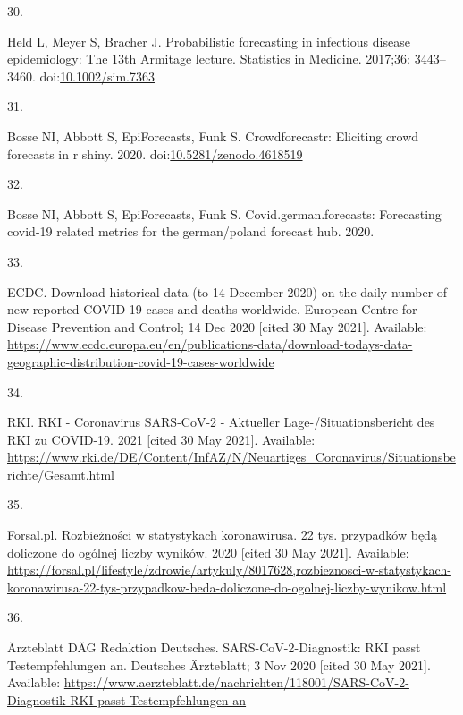 \documentclass[10pt,letterpaper]{article}
\newlength{\cslhangindent}
\newlength{\csllabelwidth}
\newlength{\cslentryspacingunit} %
\newenvironment{CSLReferences}[2] %
 {%
  \setlength{\parindent}{0pt}
  \ifodd #1
  \let\oldpar\par
  \def\par{\hangindent=\cslhangindent\oldpar}
  \fi
  \setlength{\parskip}{#2\cslentryspacingunit}
 }%
 {}
\newcommand{\CSLLeftMargin}[1]{\parbox[t]{\csllabelwidth}{#1}}
\newcommand{\CSLRightInline}[1]{\parbox[t]{\linewidth - \csllabelwidth}{#1}\break}
\begin{document}
\begin{CSLReferences}{0}{0}
\leavevmode{}%
\CSLLeftMargin{30. }%
\CSLRightInline{Held L, Meyer S, Bracher J. Probabilistic forecasting in
infectious disease epidemiology: The 13th {Armitage} lecture. Statistics
in Medicine. 2017;36: 3443--3460.
doi:\href{https://doi.org/10.1002/sim.7363}{10.1002/sim.7363}}

\leavevmode{}%
\CSLLeftMargin{31. }%
\CSLRightInline{Bosse NI, Abbott S, EpiForecasts, Funk S.
Crowdforecastr: Eliciting crowd forecasts in r shiny. 2020.
doi:\href{https://doi.org/10.5281/zenodo.4618519}{10.5281/zenodo.4618519}}

\leavevmode{}%
\CSLLeftMargin{32. }%
\CSLRightInline{Bosse NI, Abbott S, EpiForecasts, Funk S.
Covid.german.forecasts: Forecasting covid-19 related metrics for the
german/poland forecast hub. 2020. }

\leavevmode{}%
\CSLLeftMargin{33. }%
\CSLRightInline{ECDC. Download historical data (to 14 {December} 2020)
on the daily number of new reported {COVID-19} cases and deaths
worldwide. {European Centre for Disease Prevention and Control}; 14 Dec
2020 {[}cited 30 May 2021{]}. Available:
\url{https://www.ecdc.europa.eu/en/publications-data/download-todays-data-geographic-distribution-covid-19-cases-worldwide}}

\leavevmode{}%
\CSLLeftMargin{34. }%
\CSLRightInline{RKI. {RKI} - {Coronavirus SARS-CoV-2} - {Aktueller
Lage-}/{Situationsbericht} des {RKI} zu {COVID-19}. 2021 {[}cited 30 May
2021{]}. Available:
\url{https://www.rki.de/DE/Content/InfAZ/N/Neuartiges_Coronavirus/Situationsberichte/Gesamt.html}}

\leavevmode{}%
\CSLLeftMargin{35. }%
\CSLRightInline{Forsal.pl. Rozbieżności w statystykach koronawirusa. 22
tys. przypadków będą doliczone do ogólnej liczby wyników. 2020 {[}cited
30 May 2021{]}. Available:
\url{https://forsal.pl/lifestyle/zdrowie/artykuly/8017628,rozbieznosci-w-statystykach-koronawirusa-22-tys-przypadkow-beda-doliczone-do-ogolnej-liczby-wynikow.html}}

\leavevmode{}%
\CSLLeftMargin{36. }%
\CSLRightInline{Ärzteblatt DÄG Redaktion Deutsches.
SARS-CoV-2-Diagnostik: RKI passt Testempfehlungen an. {Deutsches
Ärzteblatt}; 3 Nov 2020 {[}cited 30 May 2021{]}. Available:
\url{https://www.aerzteblatt.de/nachrichten/118001/SARS-CoV-2-Diagnostik-RKI-passt-Testempfehlungen-an}}


\end{CSLReferences}
\end{document}
